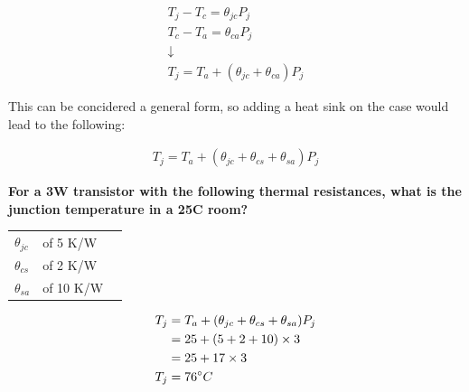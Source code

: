 \begin{gather*}
T_j - T_c = \theta_{jc}P_j \\
T_c - T_a = \theta_{ca}P_j \\
\downarrow \\
T_j = T_a + (\theta_{jc} + \theta_{ca})P_j
\end{gather*}

This can be concidered a general form, so adding a heat sink on the case would lead to the following:

\begin{gather*}
T_j = T_a + (\theta_{jc} + \theta_{cs} + \theta_{sa})P_j
\end{gather*}

\begin{framed}
\textbf{For a 3W transistor with the following thermal resistances, what is the junction temperature in a 25\degree C room?}
\begin{table}[H]
	\centering
    \begin{tabular}{lll}
    $\theta_{jc}$ & of 5 K/W \\
    $\theta_{cs}$ & of 2 K/W \\
    $\theta_{sa}$ & of 10 K/W
    \end{tabular}
\end{table}
\begin{align*}
T_j &= T_a + (\theta_{jc} + \theta_{cs} + \theta_{sa})P_j \\
    &= 25 + (5 + 2 + 10) \times 3 \\
    &= 25 + 17 \times 3 \\
T_j &= 76\degree C
\end{align*}
\end{framed}